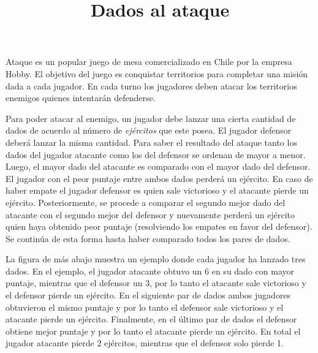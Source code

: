 \documentclass{oci}
\title{Dados al ataque}
\begin{document}
\begin{problemDescription}
  Ataque es un popular juego de mesa comercializado en Chile por la empresa Hobby.
  El objetivo del juego es conquistar territorios para completar una misión dada
  a cada jugador.
  En cada turno los jugadores deben atacar los territorios enemigos quienes
  intentarán defenderse.

  Para poder atacar al enemigo, un jugador debe lanzar una cierta cantidad de
  dados de acuerdo al número de \emph{ejércitos} que este posea.
  El jugador defensor deberá lanzar la misma cantidad.
  Para saber el resultado del ataque tanto los dados del jugador atacante como
  los del defensor se ordenan de mayor a menor.
  Luego, el mayor dado del atacante es comparado con el mayor dado del defensor.
  El jugador con el peor puntaje entre ambos dados perderá un ejército.
  En caso de haber empate el jugador defensor es quien sale victorioso y el
  atacante pierde un ejército.
  Posteriormente, se procede a comparar el segundo mejor dado del atacante con
  el segundo mejor del defensor y nuevamente perderá un ejército quien haya
  obtenido peor puntaje (resolviendo los empates en favor del defensor).
  Se continúa de esta forma hasta haber comparado todos los pares de dados.
  
  La figura de más abajo muestra un ejemplo donde cada jugador ha lanzado tres
  dados.
  En el ejemplo, el jugador atacante obtuvo un 6 en su dado con mayor puntaje,
  mientras que el defensor un 3, por lo tanto el atacante sale victorioso y el
  defensor pierde un ejército.
  En el siguiente par de dados ambos jugadores obtuvieron el mismo puntaje y por
  lo tanto el defensor sale victorioso y el atacante pierde un ejército.
  Finalmente, en el último par de dados el defensor obtiene mejor puntaje y por
  lo tanto el atacante pierde un ejército.
  En total el jugador atacante pierde 2 ejércitos, mientras que el defensor solo
  pierde 1.
  \begin{center}
\end{center}
\end{problemDescription}
\end{document}
